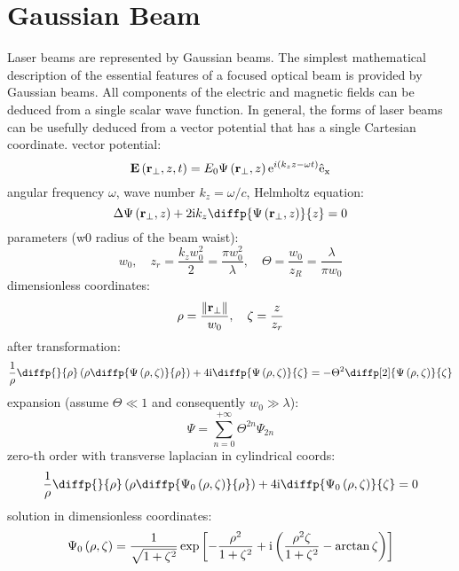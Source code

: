 \section{Gaussian Beam}
Laser beams are represented by Gaussian beams.
The simplest mathematical description of the essential features of a focused optical beam is provided by Gaussian beams.
All components of the electric and magnetic fields can be deduced from a single scalar wave function.
In general, the forms of laser beams can be usefully deduced from a vector potential that has a single Cartesian coordinate.
vector potential:
\begin{equation}
\mathbf{E}\left(\mathbf{r_\bot}, z, t \right)  = E_0 \Psi \left(\mathbf{r_\bot}, z \right) \mathrm{e}^{i \left(k_z z - \omega t \right)} \mathrm{\hat{e}_x}
\end{equation}
angular frequency $ \omega $, wave number $ k_z = \omega/c $, 
Helmholtz equation:
\begin{equation}
\laplace{\Psi \left(\vec{r_\bot}, z \right)} + 2 \i k_z \diffp{\Psi \left(\vec{r_\bot}, z \right)}{z} = 0
\end{equation}
parameters (w0 radius of the beam waist):
\begin{equation}
w_0, \quad z_r = \frac{k_z w_0^2}{2} = \frac{\pi w_0^2}{\lambda}, \quad \Theta = \frac{w_0}{z_R} = \frac{\lambda}{\pi w_0}
\end{equation}
dimensionless coordinates:
\begin{equation}
\rho = \frac{\lVert\mathbf{r_\bot}\rVert}{w_0}, \quad \zeta = \frac{z}{z_r}
\end{equation}
after transformation:
\begin{equation}
\frac{1}{\rho} \diffp{}{\rho}\left(\rho \diffp{\Psi \left(\rho, \zeta \right)}{\rho} \right) + 4 \i \diffp{\Psi \left(\rho, \zeta \right)}{\zeta}  = - \Theta^2 \diffp[2]{\Psi \left(\rho, \zeta \right)}{\zeta}
\end{equation}
expansion (assume $ \Theta \ll 1 $ and consequently $  w_0 \gg \lambda $):
\begin{equation}
\Psi = \sum_{n = 0}^{+\infty} \Theta^{2n} \Psi_{2n}
\end{equation}
zero-th order with transverse laplacian in cylindrical coords:
\begin{equation}
\frac{1}{\rho} \diffp{}{\rho}\left(\rho \diffp{\Psi_0 \left(\rho, \zeta \right)}{\rho} \right) + 4 \i \diffp{\Psi_0\left(\rho, \zeta \right)}{\zeta} = 0
\end{equation}
solution in dimensionless coordinates:
\begin{equation}
\Psi_0 \left(\rho, \zeta \right) = \frac{1}{\sqrt{1 + \zeta^2}} \exp{\left[- \frac{\rho^2}{1 + \zeta^2} + \mathrm{i}\left(\frac{\rho^2 \zeta}{1 + \zeta^2} - \arctan{\zeta} \right) \right]} 
\end{equation}

